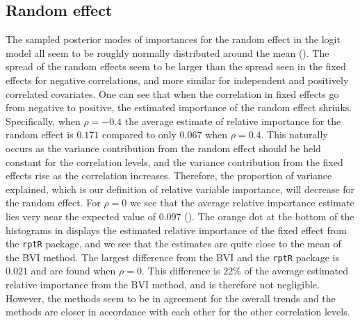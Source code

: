 \subsection{Random effect}
The sampled posterior modes of importances for the random effect in the logit model all seem to be roughly normally distributed around the mean (). The spread of the random effects seem to be larger than the spread seen in the fixed effects for negative correlations, and more similar for independent and positively correlated covariates. One can see that when the correlation in fixed effects go from negative to positive, the estimated importance of the random effect shrinks. Specifically, when $\rho=-0.4$ the average estimate of relative importance for the random effect is $0.171$ compared to only $0.067$ when $\rho=0.4$. This naturally occurs as the variance contribution from the random effect should be held constant for the correlation levels, and the variance contribution from the fixed effects rise as the correlation increases. Therefore, the proportion of variance explained, which is our definition of relative variable importance, will decrease for the random effect. For $\rho=0$ we see that the average relative importance estimate lies very near the expected value of $0.097$ (). The orange dot at the bottom of the histograms in  displays the estimated relative importance of the fixed effect from the \texttt{rptR} package, and we see that the estimates are quite close to the mean of the BVI method. The largest difference from the BVI and the \texttt{rptR} package is $0.021$ and are found when $\rho=0$. This difference is $22\%$ of the average estimated relative importance from the BVI method, and is therefore not negligible. However, the methods seem to be in agreement for the overall trends and the methods are closer in accordance with each other for the other correlation levels.
\\
\\
